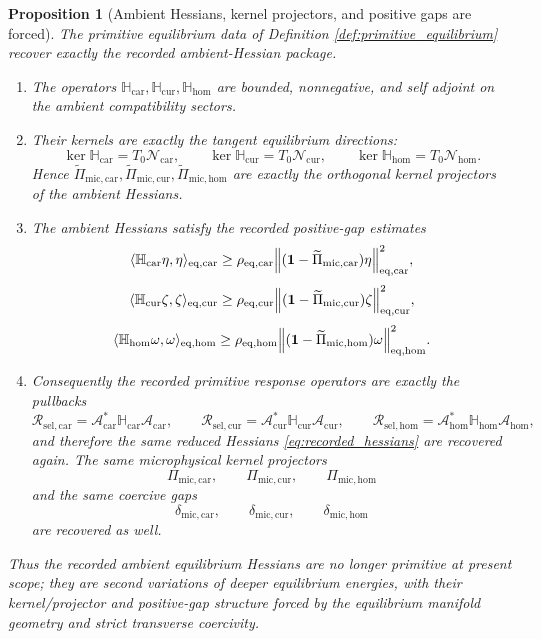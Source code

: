 \documentclass[11pt]{article}
\newcommand{\UltraCarProj}{\Pi_{\mathrm{mic,car}}}
\newcommand{\UltraCurProj}{\Pi_{\mathrm{mic,cur}}}
\newcommand{\UltraHomProj}{\Pi_{\mathrm{mic,hom}}}
\newcommand{\UltraCarGap}{\delta_{\mathrm{mic,car}}}
\newcommand{\UltraCurGap}{\delta_{\mathrm{mic,cur}}}
\newcommand{\UltraHomGap}{\delta_{\mathrm{mic,hom}}}
\newcommand{\TensorResp}{\mathcal R_{\mathrm{sel,car}}}
\newcommand{\CurResp}{\mathcal R_{\mathrm{sel,cur}}}
\newcommand{\HomResp}{\mathcal R_{\mathrm{sel,hom}}}
\newcommand{\TensorEqRead}{\mathcal A_{\mathrm{car}}}
\newcommand{\CurEqRead}{\mathcal A_{\mathrm{cur}}}
\newcommand{\HomEqRead}{\mathcal A_{\mathrm{hom}}}
\newcommand{\TensorAmbientHess}{\mathbb H_{\mathrm{car}}}
\newcommand{\CurAmbientHess}{\mathbb H_{\mathrm{cur}}}
\newcommand{\HomAmbientHess}{\mathbb H_{\mathrm{hom}}}
\newcommand{\TensorEqKerProj}{\widetilde\Pi_{\mathrm{mic,car}}}
\newcommand{\CurEqKerProj}{\widetilde\Pi_{\mathrm{mic,cur}}}
\newcommand{\HomEqKerProj}{\widetilde\Pi_{\mathrm{mic,hom}}}
\newcommand{\EqCarGap}{\rho_{\mathrm{eq,car}}}
\newcommand{\EqCurGap}{\rho_{\mathrm{eq,cur}}}
\newcommand{\EqHomGap}{\rho_{\mathrm{eq,hom}}}
\newcommand{\TensorEqManifold}{\mathcal N_{\mathrm{car}}}
\newcommand{\CurEqManifold}{\mathcal N_{\mathrm{cur}}}
\newcommand{\HomEqManifold}{\mathcal N_{\mathrm{hom}}}
\newtheorem{proposition}{Proposition}
\begin{document}
\begin{proposition}[Ambient Hessians, kernel projectors, and positive gaps are forced]
\label{prop:hessians_from_equilibrium}
The primitive equilibrium data of Definition \ref{def:primitive_equilibrium} recover exactly the recorded ambient-Hessian package.
\begin{enumerate}
    \item The operators \(\TensorAmbientHess,\CurAmbientHess,\HomAmbientHess\) are bounded, nonnegative, and self adjoint on the ambient compatibility sectors.
    \item Their kernels are exactly the tangent equilibrium directions:
    \begin{equation}
    \ker\TensorAmbientHess=T_0\TensorEqManifold,\qquad
    \ker\CurAmbientHess=T_0\CurEqManifold,\qquad
    \ker\HomAmbientHess=T_0\HomEqManifold.
    \label{eq:kernels_are_tangent}
    \end{equation}
    Hence \(\TensorEqKerProj,\CurEqKerProj,\HomEqKerProj\) are exactly the orthogonal kernel projectors of the ambient Hessians.
    \item The ambient Hessians satisfy the recorded positive-gap estimates
    \begin{equation}
    \langle \TensorAmbientHess\eta,\eta\rangle_{\mathrm{eq,car}}
    \ge
    \EqCarGap\norm{(\mathbf 1-\TensorEqKerProj)\eta}_{\mathrm{eq,car}}^2,
    \label{eq:ambient_gap_car}
    \end{equation}
    \begin{equation}
    \langle \CurAmbientHess\zeta,\zeta\rangle_{\mathrm{eq,cur}}
    \ge
    \EqCurGap\norm{(\mathbf 1-\CurEqKerProj)\zeta}_{\mathrm{eq,cur}}^2,
    \label{eq:ambient_gap_cur}
    \end{equation}
    \begin{equation}
    \langle \HomAmbientHess\omega,\omega\rangle_{\mathrm{eq,hom}}
    \ge
    \EqHomGap\norm{(\mathbf 1-\HomEqKerProj)\omega}_{\mathrm{eq,hom}}^2.
    \label{eq:ambient_gap_hom}
    \end{equation}
    \item Consequently the recorded primitive response operators are exactly the pullbacks
    \begin{equation}
    \TensorResp=\TensorEqRead^*\TensorAmbientHess\TensorEqRead,\qquad
    \CurResp=\CurEqRead^*\CurAmbientHess\CurEqRead,\qquad
    \HomResp=\HomEqRead^*\HomAmbientHess\HomEqRead,
    \label{eq:response_from_equilibrium}
    \end{equation}
    and therefore the same reduced Hessians \eqref{eq:recorded_hessians} are recovered again. The same microphysical kernel projectors
    \[
    \UltraCarProj,\qquad
    \UltraCurProj,\qquad
    \UltraHomProj
    \]
    and the same coercive gaps
    \[
    \UltraCarGap,\qquad
    \UltraCurGap,\qquad
    \UltraHomGap
    \]
    are recovered as well.
\end{enumerate}
Thus the recorded ambient equilibrium Hessians are no longer primitive at present scope; they are second variations of deeper equilibrium energies, with their kernel/projector and positive-gap structure forced by the equilibrium manifold geometry and strict transverse coercivity.
\end{proposition}
\end{document}
